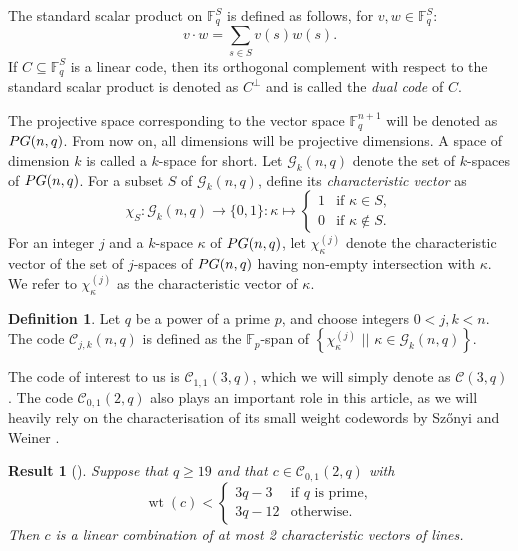\documentclass[a4paper]{article}
\newtheorem{res}[thm]{Result}
\theoremstyle{definition}
\newtheorem{df}[thm]{Definition}
\newcommand{\FF}{\mathbb F}
\newcommand{\sett}[2]{ \left\{ #1 \, \, || \, \, #2 \right \} }
\newcommand{\pg}{\textnormal{PG}}
\newcommand{\mc}{\mathcal C}
\newcommand{\mg}{\mathcal G}
\DeclareMathOperator{\wt}{wt}
\begin{document}
The standard scalar product on $\FF_q^S$ is defined as follows, for $v, w \in \FF_q^S$:
\[
 v \cdot w = \sum_{s \in S} v(s) w(s).
\]
If $C \subseteq \FF_q^S$ is a linear code, then its orthogonal complement with respect to the standard scalar product is denoted as $C^\perp$ and is called the \emph{dual code} of $C$.

\bigskip

The projective space corresponding to the vector space $\FF_q^{n+1}$ will be denoted as $\pg(n,q)$.
From now on, all dimensions will be projective dimensions. A space of dimension $k$ is called a $k$-space for short.
Let $\mg_k(n,q)$ denote the set of $k$-spaces of $\pg(n,q)$.
For a subset $S$ of $\mg_k(n,q)$, define its \emph{characteristic vector} as
\[
 \chi_S: \mg_k(n,q) \to \{0,1\}: \kappa \mapsto \begin{cases}
  1 & \text{if } \kappa \in S, \\
  0 & \text{if } \kappa \notin S.
 \end{cases}
\]
For an integer $j$ and a $k$-space $\kappa$ of $\pg(n,q)$, let $\chi_\kappa^{(j)}$ denote the characteristic vector of the set of $j$-spaces of $\pg(n,q)$ having non-empty intersection with $\kappa$.
We refer to $\chi_\kappa^{(j)}$ as the characteristic vector of $\kappa$.%

\begin{df}
 Let $q$ be a power of a prime $p$, and choose integers $0 < j,k < n$.
 The code $\mc_{j,k}(n,q)$ is defined as the $\FF_p$-span of $\sett{\chi_\kappa^{(j)}}{\kappa \in \mg_k(n,q)}$.
\end{df}

The code of interest to us is $\mc_{1,1}(3,q)$, which we will simply denote as $\mc(3,q)$.
The code $\mc_{0,1}(2,q)$ also plays an important role in this article, as we will heavily rely on the characterisation of its small weight codewords by Sz\H onyi and Weiner \cite{szonyiB}.

\begin{res}[{\cite[\S 4]{szonyiB}}]
 \label{Res:PlaneCodes}
 Suppose that $q \geq 19$ and that $c \in \mc_{0,1}(2,q)$ with
 \[
  \wt(c) < \begin{cases}
   3q-3 & \text{if $q$ is prime}, \\
   3q-12 & \text{otherwise.}
  \end{cases}
 \]
 Then $c$ is a linear combination of at most 2 characteristic vectors of lines.
\end{res}
\end{document}
